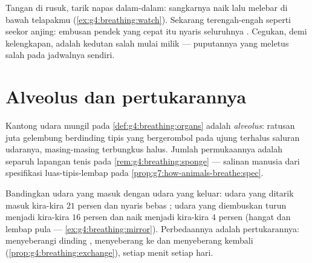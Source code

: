 \begin{example}\label{ex:g7:lungs-and-gas-exchange:feel}
Tangan di rusuk, tarik napas dalam-dalam: sangkarnya naik lalu melebar
di bawah telapakmu (\cref{ex:g4:breathing:watch}). Sekarang
terengah-engah seperti seekor anjing: embusan pendek yang cepat itu
nyaris seluruhnya . Cegukan, demi kelengkapan, adalah
kedutan salah mulai milik  --- puputannya yang meletus
salah pada jadwalnya sendiri.
\end{example}

\section{Alveolus dan pertukarannya}

\begin{definition}[Alveolus]\label{def:g7:lungs-and-gas-exchange:alveoli}
Kantong udara mungil pada \cref{def:g4:breathing:organs} adalah
\emph{alveolus}: ratusan juta gelembung berdinding
tipis yang bergerombol pada ujung terhalus saluran udaranya,
masing-masing terbungkus  halus. Jumlah permukaannya
adalah separuh lapangan tenis pada
\cref{rem:g4:breathing:sponge} --- salinan manusia dari spesifikasi
luas-tipis-lembap pada
\cref{prop:g7:how-animals-breathe:spec}.
\end{definition}

\begin{proposition}\label{prop:g7:lungs-and-gas-exchange:numbers}
Bandingkan udara yang masuk dengan udara yang keluar: udara yang
ditarik masuk kira-kira $21$ persen  dan nyaris bebas ; udara yang diembuskan turun menjadi kira-kira $16$ persen
 dan naik menjadi kira-kira $4$ persen  (hangat
dan lembap pula ---
\cref{ex:g4:breathing:mirror}). Perbedaannya adalah pertukarannya:
menyeberangi dinding ,  menyeberang ke  dan
 menyeberang kembali
(\cref{prop:g4:breathing:exchange}), setiap menit setiap hari.
\end{proposition}
\admitted

